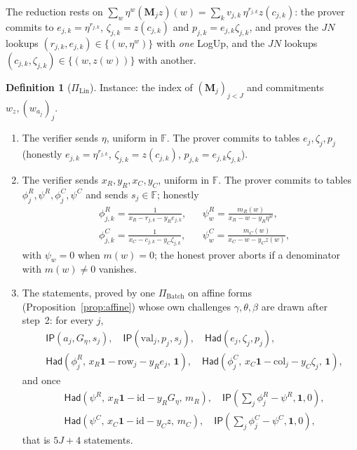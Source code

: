 \documentclass[11pt]{article}
\theoremstyle{definition}
\newtheorem{definition}[theorem]{Definition}
\newcommand{\F}{\mathbb{F}}
\begin{document}
The reduction rests on $\sum_w\eta^w(\mathbf M_jz)(w)=\sum_kv_{j,k}\,\eta^{r_{j,k}}z(c_{j,k})$: the prover commits to $e_{j,k}=\eta^{r_{j,k}}$, $\zeta_{j,k}=z(c_{j,k})$ and $p_{j,k}=e_{j,k}\zeta_{j,k}$, and proves the $JN$ lookups $(r_{j,k},e_{j,k})\in\{(w,\eta^w)\}$ with \emph{one} LogUp, and the $JN$ lookups $(c_{j,k},\zeta_{j,k})\in\{(w,z(w))\}$ with another.

\begin{definition}[$\Pi_{\mathrm{Lin}}$]\label{def:lin}
Instance: the index of $(\mathbf M_j)_{j<J}$ and commitments $w_z,(w_{a_j})_j$.
\begin{enumerate}[nosep]
\item The verifier sends $\eta$, uniform in $\F$. The prover commits to tables $e_j,\zeta_j,p_j$ (honestly $e_{j,k}=\eta^{r_{j,k}}$, $\zeta_{j,k}=z(c_{j,k})$, $p_{j,k}=e_{j,k}\zeta_{j,k}$).
\item The verifier sends $x_R,y_R,x_C,y_C$, uniform in $\F$. The prover commits to tables $\phi^R_j,\psi^R,\phi^C_j,\psi^C$ and sends $s_j\in\F$; honestly
\begin{align*}
&\phi^R_{j,k}=\frac1{x_R-r_{j,k}-y_Re_{j,k}},&& \psi^R_w=\frac{m_R(w)}{x_R-w-y_R\eta^w},\\
&\phi^C_{j,k}=\frac1{x_C-c_{j,k}-y_C\zeta_{j,k}},&& \psi^C_w=\frac{m_C(w)}{x_C-w-y_Cz(w)},
\end{align*}
with $\psi_w=0$ when $m(w)=0$; the honest prover aborts if a denominator with $m(w)\ne0$ vanishes.
\item The statements, proved by one $\Pi_{\mathrm{Batch}}$ on affine forms (Proposition~\ref{prop:affine}) whose own challenges $\gamma,\theta,\beta$ are drawn after step~2: for every $j$,
\begin{align*}
&\mathsf{IP}(a_j,G_\eta,s_j),\quad \mathsf{IP}(\mathrm{val}_j,p_j,s_j),\quad \mathsf{Had}(e_j,\zeta_j,p_j),\\
&\mathsf{Had}(\phi^R_j,\,x_R\mathbf 1-\mathrm{row}_j-y_Re_j,\,\mathbf 1),\quad \mathsf{Had}(\phi^C_j,\,x_C\mathbf 1-\mathrm{col}_j-y_C\zeta_j,\,\mathbf 1),
\end{align*}
and once
\begin{align*}
&\mathsf{Had}(\psi^R,\,x_R\mathbf 1-\mathrm{id}-y_RG_\eta,\,m_R),\quad \textstyle\mathsf{IP}(\sum_j\phi^R_j-\psi^R,\mathbf 1,0),\\
&\mathsf{Had}(\psi^C,\,x_C\mathbf 1-\mathrm{id}-y_Cz,\,m_C),\quad \textstyle\mathsf{IP}(\sum_j\phi^C_j-\psi^C,\mathbf 1,0),
\end{align*}
that is $5J+4$ statements.
\end{enumerate}
\end{definition}
\end{document}
